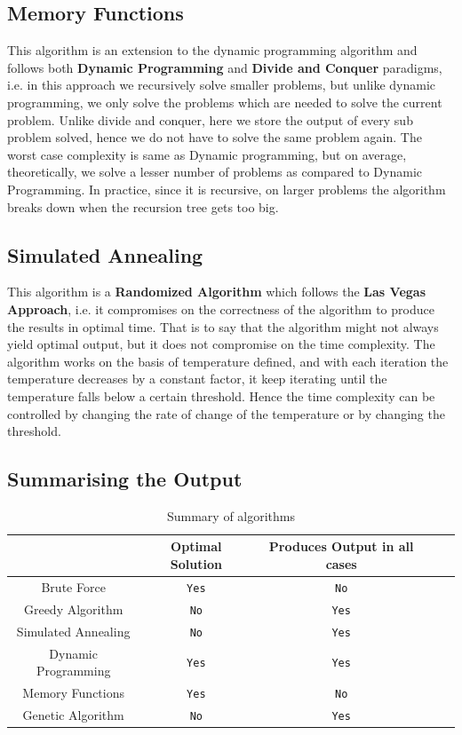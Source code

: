\documentclass[a4paper, 11pt]{article}
\begin{document}
\subsection{Memory Functions}
This algorithm is an extension to the dynamic programming algorithm and follows both \textbf{Dynamic Programming} and \textbf{Divide and Conquer} paradigms, i.e. in this approach we recursively solve smaller problems, but unlike dynamic programming, we only solve the problems which are needed to solve the current problem. Unlike divide and conquer, here we store the output of every sub problem solved, hence we do not have to solve the same problem again. The worst case complexity is same as Dynamic programming, but on average, theoretically, we solve a lesser number of problems as compared to Dynamic Programming. In practice, since it is recursive, on larger problems the algorithm breaks down when the recursion tree gets too big. 
\subsection{Simulated Annealing}
This algorithm is a \textbf{Randomized Algorithm} which follows the \textbf{Las Vegas Approach}, i.e. it compromises on the correctness of the algorithm to produce the results in optimal time. That is to say that the algorithm might not always yield optimal output, but it does not compromise on the time complexity. The algorithm works on the basis of temperature defined, and with each iteration the temperature decreases by a constant factor, it keep iterating until the temperature falls below a certain threshold. Hence the time complexity can be controlled by changing the rate of change of the temperature or by changing the threshold.

\subsection{Summarising the Output}

\begin{center}
\begin{table}[H]
\begin{tabular}{|c|c|c|c|c|} 
\hline
 & Optimal Solution  & Produces Output in all cases\\ [0.5ex]
\hline \hline
Brute Force & \texttt{Yes}  & \texttt{No} \\ 
\hline
Greedy Algorithm & \texttt{No}  & \texttt{Yes} \\ 
\hline
Simulated Annealing & \texttt{No} &  \texttt{Yes} \\ 
\hline
Dynamic Programming & \texttt{Yes} &  \texttt{Yes} \\ 
\hline
Memory Functions & \texttt{Yes} &  \texttt{No} \\ 
\hline
Genetic Algorithm & \texttt{No} &  \texttt{Yes} \\ 
\hline
\end{tabular} \\
\caption{Summary of algorithms }
\label{table:1}
\end{table}
\end{center}
\end{document}
